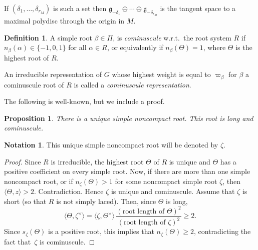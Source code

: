 \documentclass[JEP,XML,SOM,Unicode,NoFloatCountersInSection]{cedram}
\let\oldvee\vee
\renewcommand{\vee}{{\scriptscriptstyle\oldvee}}
\theoremstyle{plain}
\newtheorem{prop}[theo]{Proposition}
\theoremstyle{definition}
\newtheorem{defi}[theo]{Definition}
\newtheorem{nota}[theo]{Notation}
\let\la\langle
\let\ra\rangle
\newcommand{\fgg}{\mathfrak{g}}
\newcommand{\rkm}{{r_M}}
\newcommand{\scal}[1]{\langle #1 \rangle}
\begin{document}
If $(\delta_1,\ldots, \delta_\rkm)$ is such a set then
$\fgg_{-\delta_1}\oplus\cdots\oplus\fgg_{-\delta_\rkm}$ is the tangent space to a maximal polydisc through the
origin in $M$.

\label{subsec:minuscule-rep}


\begin{defi}
A simple root $\beta\in \Pi$, is \emph{cominuscule} w.r.t.\ the root system $R$ if
$n_\beta(\alpha)\in\{-1,0,1\}$ for all $\alpha\in R$, or equivalently if $n_\beta(\Theta)=1$, where $\Theta$ is
the highest root of $R$.

An irreducible representation of $G$ whose highest weight is equal to $\varpi_\beta$ for $\beta$
a cominuscule root of $R$ is called a \emph{cominuscule representation}.
\end{defi}

The following is well-known, but we include a proof.

\begin{prop}
\label{prop:zeta}
There is a unique simple noncompact root. This root is long and cominuscule.
\end{prop}

\begin{nota}\label{nota:zeta}
This unique simple noncompact root will be denoted by $\zeta$.
\end{nota}

\begin{proof}
Since $R$ is
irreducible, the highest root $\Theta$ of $R$ is unique and $\Theta$ has a positive
coefficient on every simple root. Now, if there are more than one simple noncompact root, or if
$n_\zeta(\Theta)>1$ for some
noncompact simple root $\zeta$, then
$\la\Theta,z\ra>2$. Contradiction. Hence $\zeta$ is unique and cominuscule.
Assume that $\zeta$ is short (so that $R$ is not simply laced). Then, since $\Theta$ is long,
$$\scal{\Theta,\zeta^\vee}=\scal{\zeta,\Theta^\vee} \, \frac{(\text{root length of }\Theta)^2}{(\text{root length of }\zeta)^2}
\geq 2.$$
Since $s_\zeta(\Theta)$ is a positive root, this implies that $n_\zeta(\Theta) \geq 2$, contradicting the
fact that~$\zeta$ is cominuscule.
\end{proof}
\end{document}

